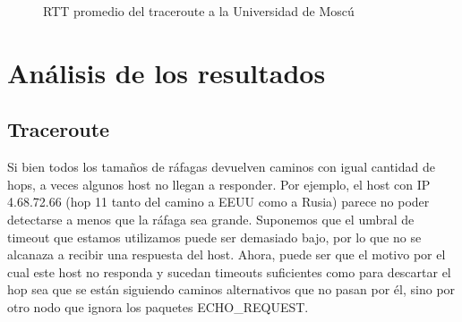 \begin{figure}[H]
  \centering
  \caption{RTT promedio del traceroute a la Universidad de Moscú}
  \label{rusiaTTL}
\end{figure}


\section{Análisis de los resultados}

\subsection {Traceroute}
Si bien todos los tamaños de ráfagas devuelven caminos con igual cantidad de hops, a veces algunos host no llegan a responder. Por ejemplo, el host con IP 4.68.72.66 (hop 11 tanto del camino a EEUU como a Rusia) parece no poder detectarse a menos que la ráfaga sea grande. Suponemos que el umbral de timeout que estamos utilizamos puede ser demasiado bajo, por lo que no se alcanaza a recibir una respuesta del host. Ahora, puede ser que el motivo por el cual este host no responda y sucedan timeouts suficientes como para descartar el hop sea que se están siguiendo caminos alternativos que no pasan por él, sino por otro nodo que ignora los paquetes ECHO\_REQUEST. 

